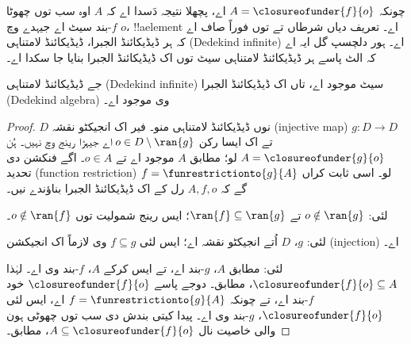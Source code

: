\documentclass[../../../include/open-logic-section]{subfiles}
\begin{document}
چونکہ $A = \closureofunder{f}{o}$ اے، پچھلا نتیجہ دَسدا اے کہ $A$
اوہ سب توں چھوٹا $f$-بند سیٹ اے جیہدے وچ $o$، !!a{element} اے۔
تعریف دیاں شرطاں  تے  توں فوراً
صاف اے کہ ہر ڈیڈیکائنڈ الجبرا، ڈیڈیکائنڈ لامتناہی (Dedekind
infinite) اے۔ ہور دلچسپ گل ایہ اے کہ الٹ پاسے ہر ڈیڈیکائنڈ
لامتناہی سیٹ توں اک ڈیڈیکائنڈ الجبرا بنایا جا سکدا اے۔

\begin{thm}
جے ڈیڈیکائنڈ لامتناہی (Dedekind infinite) سیٹ موجود اے، تاں اک
ڈیڈیکائنڈ الجبرا (Dedekind algebra) وی موجود اے۔
\end{thm}

\begin{proof}
$D$ نوں ڈیڈیکائنڈ لامتناہی منو۔ فیر اک انجیکٹو نقشہ (injective map)
$g \colon D \to D$ تے اک ایسا رکن $o  \in D \setminus \ran{g}$ اے
جیہڑا رینج وچ نہیں۔ ہُن $A = \closureofunder{g}{o}$ لو؛
 مطابق $A$ موجود اے تے $o \in A$۔ اگے فنکشن
دی تحدید (function restriction) $f = \funrestrictionto{g}{A}$ لو۔
اسی ثابت کراں گے کہ $A, f, o$ رل کے اک ڈیڈیکائنڈ الجبرا بناؤندے نیں۔

 لئی: $o \notin \ran{g}$ تے $\ran{f}
\subseteq \ran{g}$؛ ایس رینج شمولیت توں $o\notin \ran{f}$۔

 لئی: $g$، $D$ اُتے انجیکٹو نقشہ اے؛ ایس لئی
$f \subseteq g$ وی لازماً اک انجیکشن (injection) اے۔

 لئی:  مطابق $A$،
$g$-بند اے، تے ایس کرکے $A$، $f$-بند وی اے۔ لہٰذا
$\closureofunder{f}{o} \subseteq A$،  مطابق۔
دوجے پاسے $\closureofunder{f}{o}$ خود $f$-بند اے، تے چونکہ
$f = \funrestrictionto{g}{A}$ اے، ایس لئی $\closureofunder{f}{o}$،
$g$-بند وی اے۔
پیدا کیتی بندش دی سب توں چھوٹی ہون والی خاصیت نال
$A \subseteq \closureofunder{f}{o}$،  مطابق۔
\end{proof}
\end{document}

